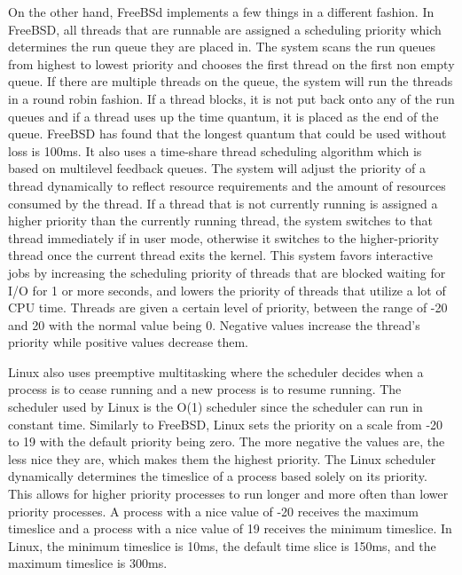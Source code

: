 \documentclass[letterpaper,10pt,draftclsnofoot,onecolumn,titlepage]{IEEEtran}
\begin{document}
		On the other hand, FreeBSd implements a few things in a different fashion. In FreeBSD, all threads that are runnable are assigned a scheduling priority which determines the run queue they are placed in.
		The system scans the run queues from highest to lowest priority and chooses the first thread on the first non empty queue.
		If there are multiple threads on the queue, the system will run the threads in a round robin fashion.
		If a thread blocks, it is not put back onto any of the run queues and if a thread uses up the time quantum, it is placed as the end of the queue.
		FreeBSD has found that the longest quantum that could be used without loss is 100ms.
		It also uses a time-share thread scheduling algorithm which is based on multilevel feedback queues.
		The system will adjust the priority of a thread dynamically to reflect resource requirements and the amount of resources consumed by the thread.
		If a thread that is not currently running is assigned a higher priority than the currently running thread, the system switches to that thread immediately if in user mode, otherwise it switches to the higher-priority thread once the current thread exits the kernel.
		This system favors interactive jobs by increasing the scheduling priority of threads that are blocked waiting for I/O for 1 or more seconds, and lowers the priority of threads that utilize a lot of CPU time.
		Threads are given a certain level of priority, between the range of -20 and 20 with the normal value being 0.
		Negative values increase the thread’s priority while positive values decrease them.

		Linux also uses preemptive multitasking where the scheduler decides when a process is to cease running and a new process is to resume running.
		The scheduler used by Linux is the O(1) scheduler since the scheduler can run in constant time. Similarly to FreeBSD, Linux sets the priority on a scale from -20 to 19 with the default priority being zero.
		The more negative the values are, the less nice they are, which makes them the highest priority. The Linux scheduler dynamically determines the timeslice of a process based solely on its priority.
		This allows for higher priority processes to run longer and more often than lower priority processes.
		A process with a nice value of -20 receives the maximum timeslice and a process with a nice value of 19 receives the minimum timeslice.
		In Linux, the minimum timeslice is 10ms, the default time slice is 150ms, and the maximum timeslice is 300ms.
\end{document}
